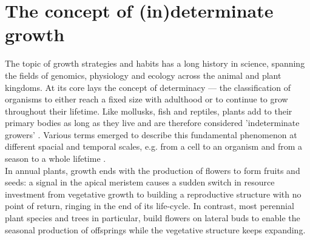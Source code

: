 \documentclass{article}
\begin{document}
	
\section*{The concept of (in)determinate growth}
The topic of growth strategies and habits has a long history in science, spanning the fields of genomics, physiology and ecology across the animal and plant kingdoms. At its core lays the concept of determinacy --- the classification of organisms to either reach a fixed size with adulthood or to continue to grow throughout their lifetime. Like mollusks, fish and reptiles, plants add to their primary bodies as long as they live and are therefore considered 'indeterminate growers' \citep{ejsmondHowTimeGrowth2010}. Various terms emerged to describe this fundamental phenomenon at different spacial and temporal scales, e.g. from a cell to an organism and from a season to a whole lifetime \citep{mcdanielInductionDeterminationDevelopmental1992a, karkachTrajectoriesModelsIndividual2006}. \\

In annual plants, growth ends with the production of flowers to form fruits and seeds: a signal in the apical meristem causes a sudden switch in resource investment from vegetative growth to building a reproductive structure with no point of return, ringing in the end of its life-cycle. In contrast, most perennial plant species and trees in particular, build flowers on lateral buds to enable the seasonal production of offsprings while the vegetative structure keeps expanding. \\
\end{document}
